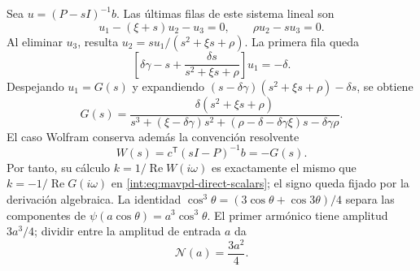Sea \(u=(P-sI)^{-1}b\). Las últimas filas de este sistema lineal son
\[
 u_1-(\xi+s)u_2-u_3=0,\qquad \rho u_2-su_3=0.
\]
Al eliminar \(u_3\), resulta
\(u_2=su_1/(s^2+\xi s+\rho)\). La primera fila queda
\[
 \left[\delta\gamma-s+\frac{\delta s}{s^2+\xi s+\rho}\right]u_1=-\delta.
\]
Despejando \(u_1=G(s)\) y expandiendo
\((s-\delta\gamma)(s^2+\xi s+\rho)-\delta s\), se obtiene
\begin{equation}
 G(s)=\frac{\delta(s^2+\xi s+\rho)}
 {s^3+(\xi-\delta\gamma)s^2+
 (\rho-\delta-\delta\gamma\xi)s-\delta\gamma\rho}.
 \label{int:eq:mavpd-transfer}
\end{equation}
El caso Wolfram conserva además la convención resolvente
\[
 W(s)=c^{\mathsf T}(sI-P)^{-1}b=-G(s).
\]
Por tanto, su cálculo \(k=1/\operatorname{Re}W(i\omega)\) es exactamente el
mismo que \(k=-1/\operatorname{Re}G(i\omega)\) en
\eqref{int:eq:mavpd-direct-scalars}; el signo queda fijado por la derivación
algebraica.
La identidad \(\cos^3\theta=(3\cos\theta+\cos3\theta)/4\) separa las
componentes de \(\psi(a\cos\theta)=a^3\cos^3\theta\). El primer armónico
tiene amplitud \(3a^3/4\); dividir entre la amplitud de entrada \(a\) da
\begin{equation}
  \mathcal N(a)=\frac{3a^2}{4}.
\end{equation}

